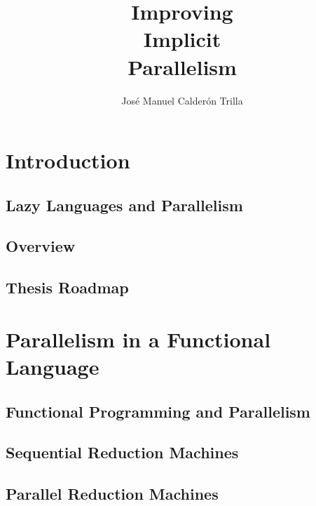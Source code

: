 \documentclass[justified, twoside, a4paper, symmetric]{tufte-book}
\title{Improving \\
       Implicit  \\
       Parallelism}
\author{Jos\'{e} Manuel Calder\'{o}n Trilla}
\newcommand{\blankpage}{\newpage\hbox{}\thispagestyle{empty}\newpage}
\begin{document}
\frontmatter


\maketitle

\tableofcontents
\listoffigures
\listoftables

\mainmatter

\chapter{Introduction}

    
    
    \section{Lazy Languages and Parallelism}
    

    \section{Overview}
    

    \section{Thesis Roadmap}

\chapter{Parallelism in a Functional Language}

    

    \section{Functional Programming and Parallelism}
    \label{sec:FPandPar}
    

    \section{Sequential Reduction Machines}
    \label{sec:SequentialMachines}
    

    \section{Parallel Reduction Machines}
    \label{sec:ParallelMachines}
    
\end{document}
